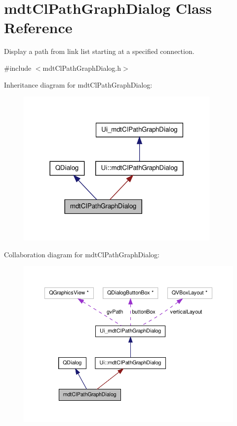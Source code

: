 \hypertarget{classmdt_cl_path_graph_dialog}{\section{mdt\-Cl\-Path\-Graph\-Dialog Class Reference}
\label{classmdt_cl_path_graph_dialog}
}


Display a path from link list starting at a specified connection.  




{\ttfamily \#include $<$mdt\-Cl\-Path\-Graph\-Dialog.\-h$>$}



Inheritance diagram for mdt\-Cl\-Path\-Graph\-Dialog\-:
\nopagebreak
\begin{figure}[H]
\begin{center}
\leavevmode
\includegraphics[width=282pt]{classmdt_cl_path_graph_dialog__inherit__graph}
\end{center}
\end{figure}


Collaboration diagram for mdt\-Cl\-Path\-Graph\-Dialog\-:
\nopagebreak
\begin{figure}[H]
\begin{center}
\leavevmode
\includegraphics[width=350pt]{classmdt_cl_path_graph_dialog__coll__graph}
\end{center}
\end{figure}
